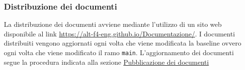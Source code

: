\subsubsection{Distribuzione dei documenti}
La distribuzione dei documenti avviene mediante l'utilizzo di un sito web disponibile al link \href{https://alt-f4-eng.github.io/Documentazione/}{https://alt-f4-eng.github.io/Documentazione/}.
I documenti distribuiti vengono aggiornati ogni volta che viene modificata la baseline ovvero ogni volta che viene modificato il ramo \texttt{main}.
L'aggiornamento dei documenti segue la procedura indicata alla sezione \hyperref[par:pubblicazione_documenti]{Pubblicazione dei documenti}